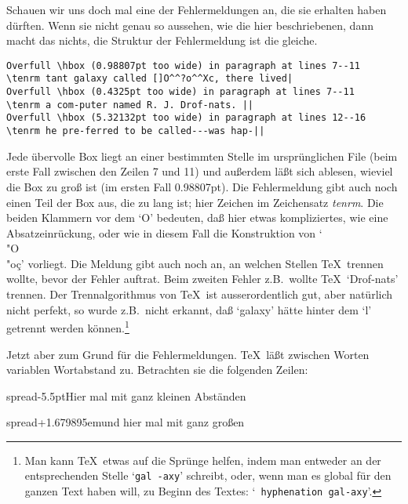 Schauen wir uns doch mal eine der Fehlermeldungen an, die sie erhalten
haben d\"urften. Wenn sie nicht genau so aussehen, wie die hier
beschriebenen, dann macht das nichts, die Struktur der Fehlermeldung
ist die gleiche.
\begin{verbatim}
Overfull \hbox (0.98807pt too wide) in paragraph at lines 7--11
\tenrm tant galaxy called []O^^?o^^Xc, there lived|
Overfull \hbox (0.4325pt too wide) in paragraph at lines 7--11
\tenrm a com-puter named R. J. Drof-nats. ||
Overfull \hbox (5.32132pt too wide) in paragraph at lines 12--16
\tenrm he pre-ferred to be called---was hap-||
\end{verbatim}
Jede \"ubervolle Box liegt an einer bestimmten Stelle im urspr\"unglichen
File (beim erste Fall zwischen den Zeilen 7 und 11) und au\ss{}erdem l\"a\ss{}t
sich ablesen, wieviel die Box zu gro\ss{} ist (im ersten Fall 0.98807pt).
Die Fehlermeldung gibt auch noch einen Teil der Box aus, die zu lang
ist; hier Zeichen im Zeichensatz {\em tenrm}. Die beiden
Klammern vor
dem `O' bedeuten, da\ss{} hier etwas kompliziertes, wie eine
Absatzeinr\"uckung, oder wie in diesem Fall die Konstruktion von
`\\"O\\"o\c c' vorliegt. Die Meldung gibt auch noch an, an welchen
Stellen \TeX\ trennen wollte, bevor der Fehler auftrat. Beim zweiten
Fehler z.B.\ wollte \TeX\ `Drof-nats' trennen. Der Trennalgorithmus von
\TeX\ ist ausserordentlich gut, aber nat\"urlich nicht perfekt, so wurde
z.B.\ nicht erkannt, da\ss{} `galaxy' h\"atte hinter dem `l' getrennt werden
k\"onnen.\footnote{Man kann \TeX\ etwas auf die Spr\"unge helfen, indem
man entweder an der entsprechenden Stelle `{\tt gal -axy}'
schreibt, oder, wenn man es 
global f\"ur den ganzen Text haben will, zu
Beginn des Textes: 
`{\tt{} hyphenation gal-axy}'.}

Jetzt aber zum Grund f\"ur die Fehlermeldungen. \TeX\ l\"a\ss{}t zwischen
Worten variablen Wortabstand
 zu. Betrachten sie die folgenden
Zeilen:\medskip

\hbox spread-5.5pt{Hier mal mit ganz kleinen Abst\"anden}

\hbox spread+1.679895em{und hier mal mit ganz gro\ss{}en}\medskip

